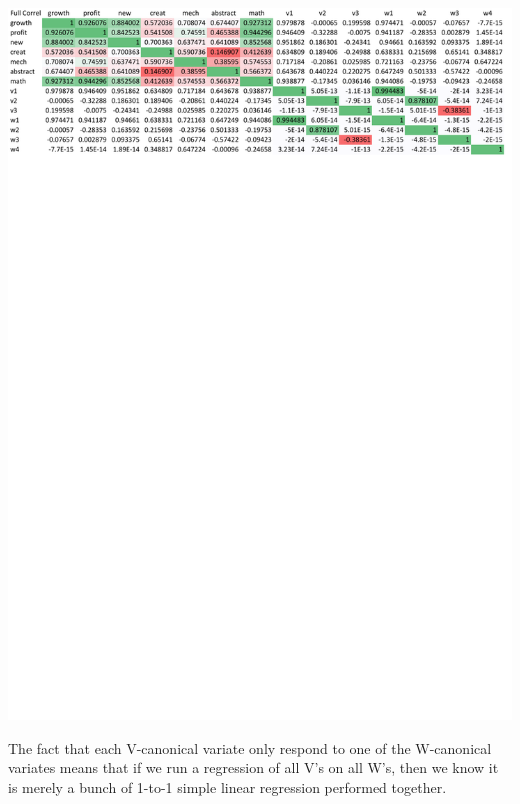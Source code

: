 \documentclass[article]{jss}
\begin{document}
        \begin{center}
          \includegraphics[width=\linewidth, keepaspectratio=true]{img/CanCorrSheetFullCorrel}
        \end{center}
        The fact that each V-canonical variate only respond to one of the W-canonical variates means that if we run a regression of all V's on all W's, then we know it is merely a bunch of 1-to-1 simple linear regression performed together.
        
\end{document}
